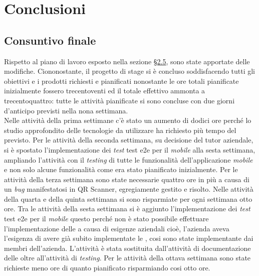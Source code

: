 
\chapter{Conclusioni}
\label{cap:conclusioni}

\section{Consuntivo finale}
Rispetto al piano di lavoro esposto nella sezione \hyperref[cap:pianificazione]{§2.5}, sono state apportate delle modifiche. Ciononostante, il progetto di stage si è concluso soddisfacendo tutti gli obiettivi e i prodotti richiesti e pianificati nonostante le ore totali pianificate inizialmente fossero trecentoventi ed il totale effettivo ammonta a trecentoquattro: tutte le attività pianificate si sono concluse con due giorni d'anticipo previsti nella nona settimana.\\

Nelle attività della prima settimane c'è stato un aumento di dodici ore perché lo studio approfondito delle tecnologie da utilizzare ha richiesto più tempo del previsto. Per le attività della seconda settimana, su decisione del tutor aziendale, si è spostato l'implementazione dei \emph{test} \gls{test e2e} per il \emph{mobile} alla sesta settimana, ampliando l'attività con il \emph{testing} di tutte le funzionalità dell'applicazione \emph{mobile} e non solo alcune funzionalità come era stato pianificato inizialmente. Per le attività della terza settimana sono state necessarie quattro ore in più a causa di un \emph{bug} manifestatosi in QR Scanner, egregiamente gestito e risolto. Nelle attività della quarta e della quinta settimana si sono risparmiate per ogni settimana otto ore. Tra le attività della sesta settimana si è aggiunto l'implementazione dei \emph{test} \gls{test e2e} per il \emph{mobile} questo perché non è stato possibile effettuare l'implementazione delle \textcolor{SchoolColor}{\ap{[g]}} a causa di esigenze aziendali cioè, l'azienda aveva l'esigenza di avere già subito implementate le \textcolor{SchoolColor}{\ap{[g]}}, cosi sono state implementante dai membri dell'azienda. L'attività è stata sostituita dall'attività di documentazione delle \textcolor{SchoolColor}{\ap{[g]}} oltre all'attività di \emph{testing}.
Per le attività della ottava settimana sono state richieste meno ore di quanto pianificato risparmiando cosi otto ore.\\

